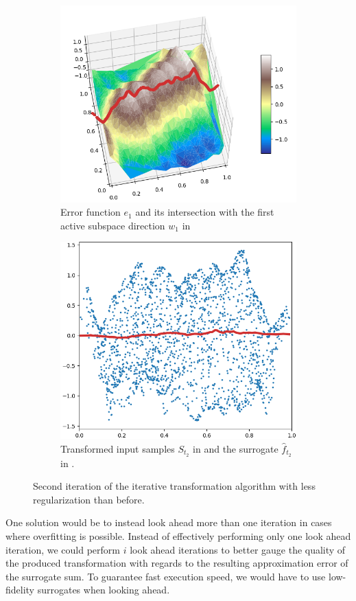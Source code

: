 \documentclass[
  a4paper,  %
  twoside,  %
  bibliography=totoc,
  headsepline,
  cleardoublepage=empty,
  parskip=half,
  draft=false
]{scrbook}
\begin{document}
\begin{mdframed}[style=style]
\begin{figure}[H]
\begin{subfigure}{.5\textwidth}
  \centering
  \includegraphics[width=.85\linewidth]{graphics/pipeline_bad_current_2.png}
  \caption{Error function $e_1$ and its intersection with the first active subspace direction $w_1$ in \reddot}
\label{fig:pipeline_bad_current_2}
\end{subfigure}%
\begin{subfigure}{.5\textwidth}
  \centering
  \includegraphics[width=.85\linewidth]{graphics/pipeline_bad_local_2.png}
  \caption{Transformed input samples $S_{t_2}$ in \blue and the surrogate $\hat{f}_{t_2}$ in \red.}
\label{fig:pipeline_bad_local_2}
\end{subfigure}
\delimit
\caption{Second iteration of the iterative transformation algorithm with less regularization than before.}
\label{fig:pipeline_bad_2}
\end{figure}
\end{mdframed}
%
One solution would be to instead look ahead more than one iteration in cases where overfitting is possible.
Instead of effectively performing only one look ahead iteration, we could perform $i$ look ahead iterations to better gauge the quality of the produced transformation with regards to the resulting approximation error of the surrogate sum.
To guarantee fast execution speed, we would have to use low-fidelity surrogates when looking ahead.
\end{document}
